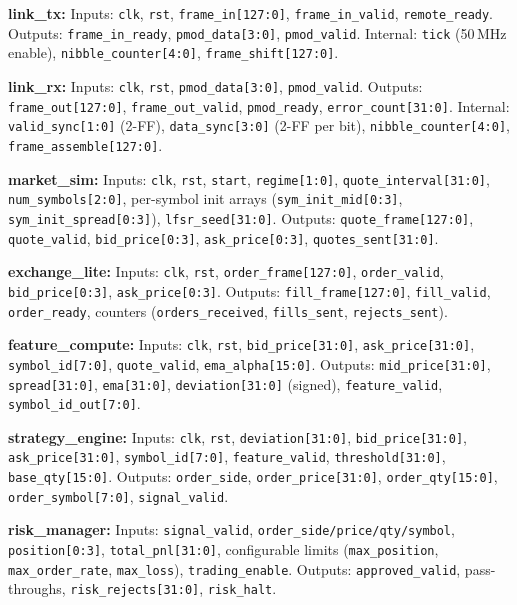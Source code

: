 \documentclass[conference]{IEEEtran}
\begin{document}
\textbf{link\_tx:} Inputs: \texttt{clk}, \texttt{rst}, \texttt{frame\_in[127:0]}, \texttt{frame\_in\_valid}, \texttt{remote\_ready}. Outputs: \texttt{frame\_in\_ready}, \texttt{pmod\_data[3:0]}, \texttt{pmod\_valid}. Internal: \texttt{tick} (50\,MHz enable), \texttt{nibble\_counter[4:0]}, \texttt{frame\_shift[127:0]}.

\textbf{link\_rx:} Inputs: \texttt{clk}, \texttt{rst}, \texttt{pmod\_data[3:0]}, \texttt{pmod\_valid}. Outputs: \texttt{frame\_out[127:0]}, \texttt{frame\_out\_valid}, \texttt{pmod\_ready}, \texttt{error\_count[31:0]}. Internal: \texttt{valid\_sync[1:0]} (2-FF), \texttt{data\_sync[3:0]} (2-FF per bit), \texttt{nibble\_counter[4:0]}, \texttt{frame\_assemble[127:0]}.

\textbf{market\_sim:} Inputs: \texttt{clk}, \texttt{rst}, \texttt{start}, \texttt{regime[1:0]}, \texttt{quote\_interval[31:0]}, \texttt{num\_symbols[2:0]}, per-symbol init arrays (\texttt{sym\_init\_mid[0:3]}, \texttt{sym\_init\_spread[0:3]}), \texttt{lfsr\_seed[31:0]}. Outputs: \texttt{quote\_frame[127:0]}, \texttt{quote\_valid}, \texttt{bid\_price[0:3]}, \texttt{ask\_price[0:3]}, \texttt{quotes\_sent[31:0]}.

\textbf{exchange\_lite:} Inputs: \texttt{clk}, \texttt{rst}, \texttt{order\_frame[127:0]}, \texttt{order\_valid}, \texttt{bid\_price[0:3]}, \texttt{ask\_price[0:3]}. Outputs: \texttt{fill\_frame[127:0]}, \texttt{fill\_valid}, \texttt{order\_ready}, counters (\texttt{orders\_received}, \texttt{fills\_sent}, \texttt{rejects\_sent}).

\textbf{feature\_compute:} Inputs: \texttt{clk}, \texttt{rst}, \texttt{bid\_price[31:0]}, \texttt{ask\_price[31:0]}, \texttt{symbol\_id[7:0]}, \texttt{quote\_valid}, \texttt{ema\_alpha[15:0]}. Outputs: \texttt{mid\_price[31:0]}, \texttt{spread[31:0]}, \texttt{ema[31:0]}, \texttt{deviation[31:0]} (signed), \texttt{feature\_valid}, \texttt{symbol\_id\_out[7:0]}.

\textbf{strategy\_engine:} Inputs: \texttt{clk}, \texttt{rst}, \texttt{deviation[31:0]}, \texttt{bid\_price[31:0]}, \texttt{ask\_price[31:0]}, \texttt{symbol\_id[7:0]}, \texttt{feature\_valid}, \texttt{threshold[31:0]}, \texttt{base\_qty[15:0]}. Outputs: \texttt{order\_side}, \texttt{order\_price[31:0]}, \texttt{order\_qty[15:0]}, \texttt{order\_symbol[7:0]}, \texttt{signal\_valid}.

\textbf{risk\_manager:} Inputs: \texttt{signal\_valid}, \texttt{order\_side/price/qty/symbol}, \texttt{position[0:3]}, \texttt{total\_pnl[31:0]}, configurable limits (\texttt{max\_position}, \texttt{max\_order\_rate}, \texttt{max\_loss}), \texttt{trading\_enable}. Outputs: \texttt{approved\_valid}, pass-throughs, \texttt{risk\_rejects[31:0]}, \texttt{risk\_halt}.
\end{document}
